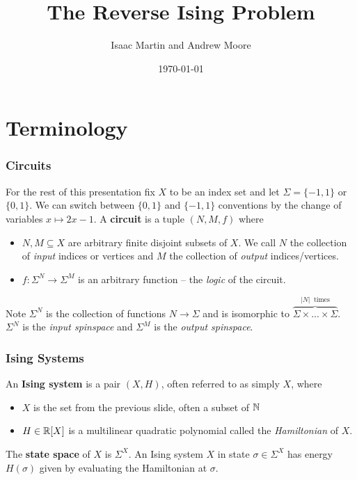 \documentclass[8pt, mathserif, notheorems]{beamer}
\title{The Reverse Ising Problem}
\author{Isaac Martin and Andrew Moore}
\institute{University of Texas at Austin}
\date{\today}
\begin{document}
\frame{\titlepage}

\section{Terminology}
\begin{frame}[c]\frametitle{Circuits}
    For the rest of this presentation fix $X$ to be an index set and let $\Sigma = \{-1,1\}$ or $\{0,1\}$. We can switch between $\{0,1\}$ and $\{-1,1\}$ conventions by the change of variables $x\mapsto 2x - 1$. A \textbf{circuit} is a tuple $(N,M,f)$ where

    \bigskip

    \begin{itemize}    
        \item $N, M \subseteq X$ are arbitrary finite disjoint subsets of $X$. We call $N$ the collection of \textit{input} indices or vertices and $M$ the collection of \textit{output} indices/vertices.
            
            \bigskip

        \item $f: \Sigma^N \to \Sigma^M$ is an arbitrary function -- the \textit{logic} of the circuit.
    \end{itemize}
    
    \bigskip

    Note $\Sigma^N$ is the collection of functions $N\to \Sigma$ and is isomorphic to $\overbrace{\Sigma\times ...\times \Sigma}^{|N| ~\text{ times}}$. $\Sigma^N$ is the \textit{input spinspace} and $\Sigma^M$ is the \textit{output spinspace}.
\end{frame}
\begin{frame}[c]\frametitle{Ising Systems}

  An \textbf{Ising system} is a pair $(X, H)$, often referred to as simply $X$, where

  \bigskip

  \begin{itemize}
    \item $X$ is the set from the previous slide, often a subset of $\mathbb{N}$ 
        \bigskip

    \item $H \in \mathbb{R}[X]$ is a multilinear quadratic polynomial called the \textit{Hamiltonian} of $X$.
  \end{itemize}

  \bigskip

  The \textbf{state space} of $X$ is $\Sigma^X$. An Ising system $X$ in state $\sigma \in \Sigma^X$ has energy $H(\sigma)$ given by evaluating the Hamiltonian at $\sigma$.
\end{frame}
\end{document}
